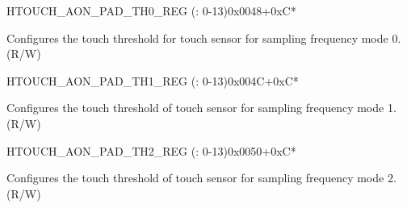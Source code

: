 \begin{register}{H}{TOUCH\_AON\_PAD\_TH0\_REG (: 0-13)}{0x0048+0xC*}\label{regdesc:TOUCHAONPADNTH0REG}
%
%
\regnewline%
\begin{regdesc}\begin{reglist}
\label{fielddesc:TOUCHAONTOUCHPAD0TH0}\item [TOUCH\_AON\_TOUCH\_PAD\regindex{n}\_TH0] Configures the touch threshold for touch sensor  for sampling frequency mode 0. (R/W)
\end{reglist}\end{regdesc}
\end{register}


\begin{register}{H}{TOUCH\_AON\_PAD\_TH1\_REG (: 0-13)}{0x004C+0xC*}\label{regdesc:TOUCHAONPADNTH1REG}
%
%
\regnewline%
\begin{regdesc}\begin{reglist}
\label{fielddesc:TOUCHAONTOUCHPAD0TH1}\item [TOUCH\_AON\_TOUCH\_PAD\regindex{n}\_TH1] Configures the touch threshold of touch sensor  for sampling frequency mode 1. (R/W)
\end{reglist}\end{regdesc}
\end{register}


\begin{register}{H}{TOUCH\_AON\_PAD\_TH2\_REG (: 0-13)}{0x0050+0xC*}\label{regdesc:TOUCHAONPADNTH2REG}
%
%
\regnewline%
\begin{regdesc}\begin{reglist}
\label{fielddesc:TOUCHAONTOUCHPAD0TH2}\item [TOUCH\_AON\_TOUCH\_PAD\regindex{n}\_TH2] Configures the touch threshold of touch sensor  for sampling frequency mode 2. (R/W)
\end{reglist}\end{regdesc}
\end{register}


